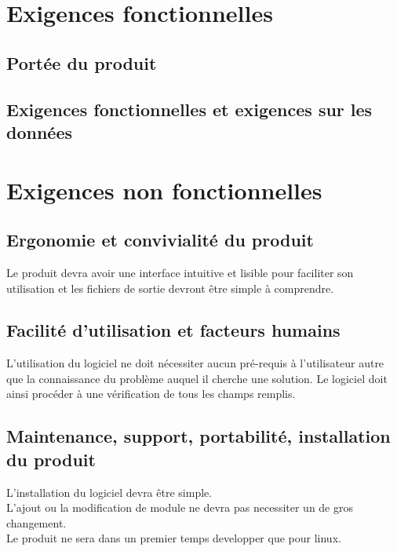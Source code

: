 \documentclass[a4paper,11pt]{article}
\begin{document}
	\section{Exigences fonctionnelles}
		\subsection{Portée du produit}
		
		\subsection{Exigences fonctionnelles et exigences sur les données}
			
			
	\section{Exigences non fonctionnelles}
		\subsection{Ergonomie et convivialité du produit}
			Le produit devra avoir une interface intuitive et lisible pour faciliter son utilisation et les fichiers de sortie devront être simple à comprendre.
		
		\subsection{Facilité d’utilisation et facteurs humains}
			L’utilisation du logiciel ne doit nécessiter aucun pré-requis à l’utilisateur autre que la connaissance du problème auquel il cherche une solution. 
			Le logiciel doit ainsi procéder à une vérification de tous les champs remplis.
		
		\subsection{Maintenance, support, portabilité, installation du produit}
			L'installation du logiciel devra être simple.\\
			L'ajout ou la modification de module ne devra pas necessiter un de gros changement.\\
			Le produit ne sera dans un premier temps developper que pour linux.\\
			
\end{document}
